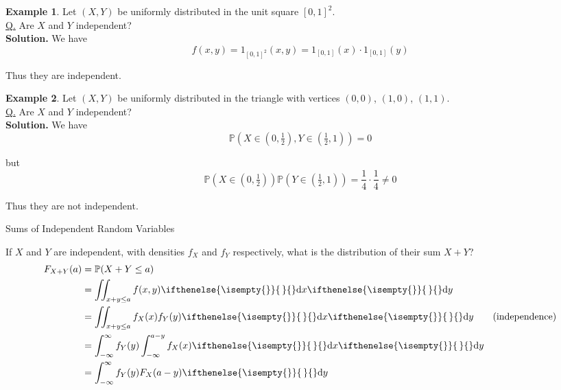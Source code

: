 \documentclass[a4paper,11pt]{amsbook}
\makeatletter
\def\section{\@startsection{section}{2}%
    \z@{1\linespacing\@plus1\linespacing}{.5\linespacing}%
    {\large\normalfont\bfseries\centering\color{darkblue}}}
\theoremstyle{definition}
\newtheorem{example}{\hspace{-2em} \color{darkblue} Example}[chapter]
\theoremstyle{remark}
\renewcommand{\P}{\mathbb{P}}
\newcommand\0{\varnothing}
\newcommand\dx[1][]{\ifthenelse{\isempty{#1}}{\,}{}\mathrm{d}x}
\newcommand\dy[1][]{\ifthenelse{\isempty{#1}}{\,}{}\mathrm{d}y}
\makeatother
\begin{document}
    \begin{example}
        Let $(X,Y)$ be uniformly distributed in the unit square $[0,1]^2$.\\
        \underline{Q.} Are $X$ and $Y$ independent?\\
        \textbf{Solution.} We have $$f(x,y)=1_{[0,1]^2}(x,y)=1_{[0,1]}(x)\cdot1_{[0,1]}(y)$$

        Thus they are independent.
    \end{example}

    \begin{example}
        Let $(X,Y)$ be uniformly distributed in the triangle with vertices $(0,0)$, $(1,0)$, $(1,1)$.\\
        \underline{Q.} Are $X$ and $Y$ independent?\\
        \textbf{Solution.} We have $$\P(X\in(0,\tfrac12),Y\in(\tfrac12,1))=0$$

        but $$\P(X\in(0,\tfrac12))\P(Y\in(\tfrac12,1))=\frac{1}{4}\cdot\frac{1}{4}\neq0$$
        \begin{center}
        \end{center}

        Thus they are not independent.
    \end{example}

    \section{Sums of Independent Random Variables}

    If $X$ and $Y$ are independent, with densities $f_X$ and $f_Y$ respectively, what is the distribution of their sum $X+Y$?\\
    \begin{align*}
        F_{X+Y}(a)&=\P(X+Y\leq a) \\
        &=\iint_{x+y\leq a}f(x,y)\dx\dy \\
        &=\iint_{x+y\leq a}f_X(x)f_Y(y)\dx\dy \tag{independence} \\
        &=\int_{-\infty}^\infty f_Y(y)\int_{-\infty}^{a-y}f_X(x)\dx\dy \\
        &=\int_{-\infty}^\infty f_Y(y)F_X(a-y)\dy \\
    \end{align*}
\end{document}
